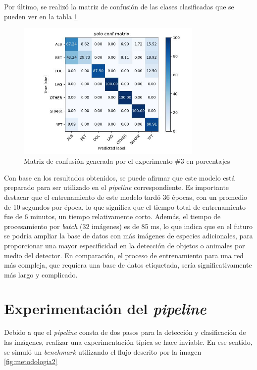 Por último, se realizó la matriz de confusión de las clases clasificadas que se pueden ver en la tabla \ref{fig:Matrix3}

\begin{figure}[h!]
\centering
\includegraphics[width=0.8\textwidth]{images/yolo_conf_matrix.jpg}
\caption{Matriz de confusión generada por el experimento \#3 en porcentajes}
\label{fig:Matrix3}

\end{figure}

Con base en los resultados obtenidos, se puede afirmar que este modelo está preparado para ser utilizado en el \textit{pipeline} correspondiente. Es importante destacar que el entrenamiento de este modelo tardó 36 épocas, con un promedio de 10 segundos por época, lo que significa que el tiempo total de entrenamiento fue de 6 minutos, un tiempo relativamente corto. Además, el tiempo de procesamiento por \textit{batch} (32 imágenes) es de 85 ms, lo que indica que en el futuro se podría ampliar la base de datos con más imágenes de especies adicionales, para proporcionar una mayor especificidad en la detección de objetos o animales por medio del detector. En comparación, el proceso de entrenamiento para una red más compleja, que requiera una base de datos etiquetada, sería significativamente más largo y complicado.

\section{Experimentación del \textit{pipeline}}
Debido a que el \textit{pipeline} consta de dos pasos para la detección y clasificación de las imágenes, realizar una experimentación típica se hace inviable. En ese sentido, se simuló un \textit{benchmark} utilizando el flujo descrito por la imagen \ref{fig:metodologia2}

